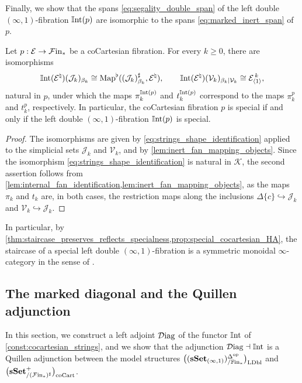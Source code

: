 \documentclass[10pt,reqno]{amsart}
\begin{document}
Finally, we show that the spans \eqref{eq:segality_double_span} of the
left double $(\infty,1)$-fibration $\mathbb{I}\mathrm{nt}(p)$ are isomorphic to the
spans \eqref{eq:marked_inert_span} of $p$.

\begin{corollary}
\label{cor:strings_specialness}
Let $p:\mathcal E\to \mathcal{F}\mathrm{in}_*$ be a coCartesian fibration. For every
$k\geq0$, there are isomorphisms
\[
 \mathbb{I}\mathrm{nt}(\mathcal E^\natural)(\mathcal J_k)_{\beta_k}
 \cong\operatorname{Map}^\flat((\mathcal J_k)^\sharp_{\beta_k},\mathcal E^\natural),
 \qquad
 \mathbb{I}\mathrm{nt}(\mathcal E^\natural)(\mathcal V_k)_{\beta_k|\mathcal V_k}
 \cong\mathcal E_{\langle1\rangle}^{\,k},
\]
natural in $p$, under which the maps $\pi_k^{\mathbb{I}\mathrm{nt}(p)}$ and
$t_k^{\mathbb{I}\mathrm{nt}(p)}$ correspond to the maps $\pi_k^p$ and $t_k^p$,
respectively. In particular, the coCartesian fibration $p$ is
special if and only if the left double $(\infty,1)$-fibration
$\mathbb{I}\mathrm{nt}(p)$ is special.
\end{corollary}

\begin{proof}
The isomorphisms are given by
\eqref{eq:strings_shape_identification} applied to the simplicial sets
$\mathcal J_k$ and $\mathcal V_k$, and by
\cref{lem:inert_fan_mapping_objects}. Since the isomorphism
\eqref{eq:strings_shape_identification} is natural in $\mathcal K$,
the second assertion follows from
\cref{lem:internal_fan_identification,lem:inert_fan_mapping_objects},
as the maps $\pi_k$ and $t_k$ are, in both cases, the restriction
maps along the inclusions $\Delta\{c\}\hookrightarrow\mathcal J_k$
and $\mathcal V_k\hookrightarrow\mathcal J_k$.
\end{proof}

In particular, by
\cref{thm:staircase_preserves_reflects_specialness,prop:special_cocartesian_HA},
the staircase of a special left double $(\infty,1)$-fibration is a
symmetric monoidal $\infty$-category in the sense of
\cite[Definition~2.0.0.7]{LurieHA}.

\subsection{The marked diagonal and the Quillen adjunction}
\label{subsec:marked_diagonal_adjunction}

In this section, we construct a left adjoint $\mathcal{D}\mathrm{iag}$ of the functor
$\mathbb{I}\mathrm{nt}$ of \cref{const:cocartesian_strings}, and we show that the
adjunction $\mathcal{D}\mathrm{iag}\dashv\mathbb{I}\mathrm{nt}$ is a Quillen adjunction between the
model structures $\bigl((\mathbf{sSet}_{(\infty,1)})^{\Delta^{\mathrm{op}}}_{/\mathbb{F}\mathrm{in}_*}\bigr)_{\mathrm{LDbl}}$ and $\bigl(\mathbf{sSet}^+_{/(\mathcal{F}\mathrm{in}_*)^\sharp}\bigr)_{\mathrm{coCart}}$.
\end{document}
